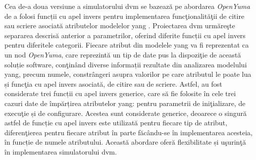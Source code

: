 Cea de-a doua versiune a simulatorului \gls{dvm} se bazează pe abordarea \textit{OpenYuma} de a folosi funcții cu apel invers pentru implementarea funcţionalităţii de citire sau scriere asociată atributelor modelelor \gls{yang} \cite{openyuma2012qsg}. Proiectarea \gls{dvm} urmăreşte separarea descrisă anterior a parametrilor, oferind diferite funcții cu apel invers pentru diferitele categorii. Fiecare atribut din modelele \gls{yang} va fi reprezentat ca un nod \textit{OpenYuma}, care reprezintă un tip de date pus la dispoziţie de această soluție software, conţinând diverse informații rezultate din analizarea modelului \gls{yang}, precum numele, constrângeri asupra valorilor pe care atributul le poate lua și funcţia cu apel invers asociată, de citire sau de scriere. Astfel, au fost considerate trei funcții cu apel invers generice, care să fie folosite în cele trei cazuri date de împărțirea atributelor \gls{yang}: pentru parametrii de iniţializare, de execuţie și de configurare. Acestea sunt considerate generice, deoarece o singură astfel de funcție cu apel invers este utilizată pentru fiecare tip de atribut, diferenţierea pentru fiecare atribut în parte făcându-se în implementarea acesteia, în funcție de numele atributului. Această abordare oferă flexibilitate și uşurinţă în implementarea simulatorului \gls{dvm}.

